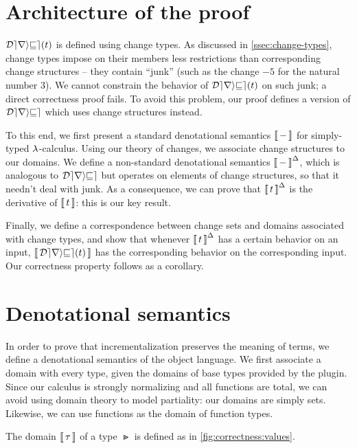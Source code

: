 



\section{Architecture of the proof}

$\Derive{t}$ is defined using change types. As discussed in
\cref{ssec:change-types}, change types impose on their members
less restrictions than corresponding change structures -- they
contain ``junk'' (such as the change $-5$ for the natural number $3$). 
We cannot constrain the behavior of
$\Derive{t}$ on such junk; a direct correctness proof fails. To
avoid this problem, our proof defines a version of $\mathcal{Derive}$
which uses change structures instead.


To this end, we first present a standard denotational semantics
$\Eval{-}$ for simply-typed $\lambda$-calculus. Using our theory of
changes, we associate change structures to our domains. We define
a non-standard denotational semantics $\EvalInc{-}$, which is
analogous to $\mathcal{Derive}$ but operates on elements of change
structures, so that it needn't deal with junk. As a consequence,
we can prove that $\EvalInc{t}$ is the derivative of $\Eval{t}$:
this is our key result.

Finally, we define a correspondence between change sets and
domains associated with change types, and show that whenever
$\EvalInc{t}$ has a certain behavior on an input,
$\Eval{\Derive{t}}$ has the corresponding behavior on the
corresponding input. Our correctness property follows as a
corollary.

\section{Denotational semantics}
\label{sec:denotational-sem}

In order to prove that incrementalization preserves the meaning
of terms, we define a denotational semantics of the object
language. We first associate a domain with every type, given the
domains of base types provided by the plugin. Since our calculus
is strongly normalizing and all functions are total, we can
avoid using domain theory to model partiality: our domains are
simply sets. Likewise, we can use functions as the domain of function types.


\begin{definition}[Domains]
  The domain $\Eval{\Gt}$ of a type $\Gt$ is defined as in
  \cref{fig:correctness:values}.
\end{definition}

